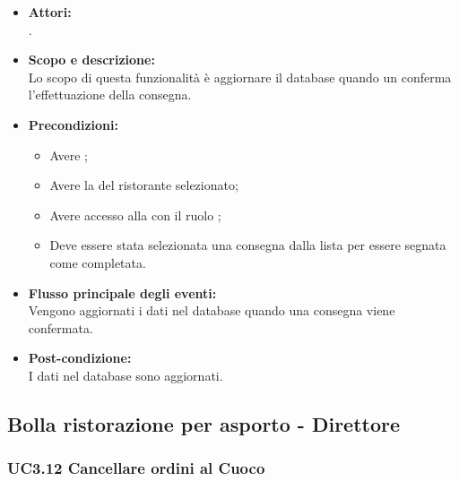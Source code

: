 \begin{itemize}
	\item \textbf{Attori:}
	\\.
	\item \textbf{Scopo e descrizione:} 
	\\Lo scopo di questa funzionalità è aggiornare il database quando un  conferma l'effettuazione della consegna.
	\item \textbf{Precondizioni:}
	\begin{itemize}
		\item Avere ;
		\item Avere la  del ristorante selezionato;
		\item Avere accesso alla  con il ruolo ;
		\item Deve essere stata selezionata una consegna dalla lista per essere segnata come completata.
	\end{itemize}
	\item \textbf{Flusso principale degli eventi:}
	\\Vengono aggiornati i dati nel database quando una consegna viene confermata.
	\item \textbf{Post-condizione:}
	\\I dati nel database sono aggiornati.
\end{itemize}

\subsection{Bolla ristorazione per asporto - Direttore}

\subsubsection{UC3.12 Cancellare ordini al Cuoco} \label{UC3.12}

